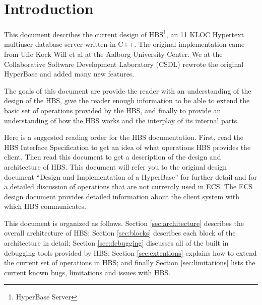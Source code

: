 
\section{Introduction}

This document describes the current design of HBS\footnote{HyperBase
Server}, an 11 KLOC Hypertext multiuser database server written in C++.  The
original implementation came from Uffe Kock Will et al \cite{Wiil90a} at the
Aalborg University Center.  We at the Collaborative Software Development
Laboratory (CSDL) rewrote the original HyperBase and added many new
features.

The goals of this document are provide the reader with an understanding of
the design of the HBS, give the reader enough information to be able to
extend the basic set of operations provided by the HBS,  and finally
to provide an
understanding of how the HBS works and the interplay of its internal parts.

Here is a suggested reading order for the HBS documentation.  First, read the HBS
Interface Specification \cite{csdl-94-14} to get an idea of what
operations HBS provides the client.  Then read this document to get a
description of the design and architecture of HBS.  This document will
refer you to the original design document ``Design and Implementation of a
HyperBase'' \cite{Wiil90a} for further detail and for a detailed discussion
of operations that are not currently used in ECS.  The ECS design
document \cite{csdl-94-13} provides detailed information about the client
system with which HBS communicates.

This document is organized as follows.  Section \ref{sec:architecture}
describes the overall architecture of HBS; Section \ref{sec:blocks}
describes each block of the architecture in detail;  Section
\ref{sec:debugging} discusses all of the built in debugging tools provided
by HBS; Section \ref{sec:extentions} explains how to extend the current set
of operations in HBS; and finally Section \ref{sec:limitations} lists the
current known bugs, limitations and issues with HBS.

